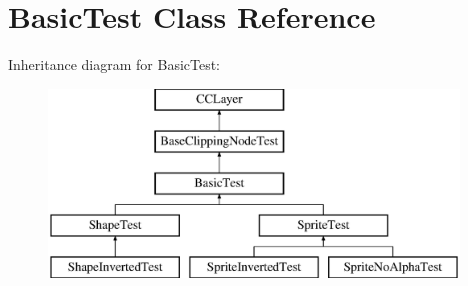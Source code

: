 \hypertarget{interface_basic_test}{\section{Basic\-Test Class Reference}
\label{interface_basic_test}
}
Inheritance diagram for Basic\-Test\-:\begin{figure}[H]
\begin{center}
\leavevmode
\includegraphics[height=5.000000cm]{interface_basic_test}
\end{center}
\end{figure}
